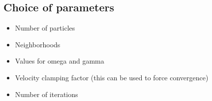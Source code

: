 \subsection{Choice of parameters}
\begin{itemize}
    \item Number of particles
    \item Neighborhoods
    \item Values for omega and gamma
    \item Velocity clamping factor (this can be used to force convergence)
    \item Number of iterations
\end{itemize}
